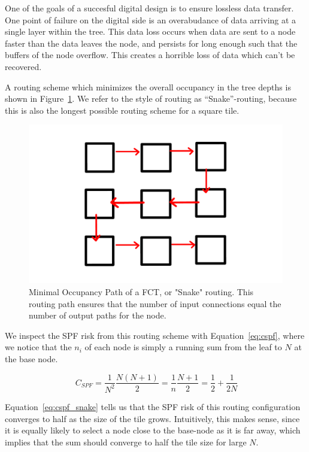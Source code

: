 One of the goals of a succesful digital design is to ensure lossless data transfer.
One point of failure on the digital side is an overabudance of data arriving at a single layer within the tree.
This data loss occurs when data are sent to a node faster than the data leaves the node, and persists for long enough such that the buffers of the node overflow.
This creates a horrible loss of data which can't be recovered.

A routing scheme which minimizes the overall occupancy in the tree depths is shown in Figure~\ref{fig:snake}.
We refer to the style of routing as ``Snake''-routing, because this is also the longest possible routing scheme for a square tile.

\begin{figure}[]
\centering
\includegraphics[width=\textwidth]{images/snakeroute.pdf}
\caption{Minimal Occupancy Path of a FCT, or "Snake" routing.
This routing path ensures that the number of input connections equal the number of output paths for the node.}
\label{fig:snake}
\end{figure}

We inspect the SPF risk from this routing scheme with Equation~\ref{eq:cspf}, where we notice that the $n_{i}$ of each node is simply a running sum from the leaf to $N$ at the base node.

\begin{equation}~\label{eq:cspf_snake}
  C_{SPF} = \frac{1}{N^{2}}\frac{N(N+1)}{2} = \frac{1}{n}\frac{N+1}{2} = \frac{1}{2} + \frac{1}{2N}
\end{equation}

Equation~\ref{eq:cspf_snake} tells us that the SPF risk of this routing configuration converges to half as the size of the tile grows.
Intuitively, this makes sense, since it is equally likely to select a node close to the base-node as it is far away, which implies that the sum should converge to half the tile size for large $N$.

